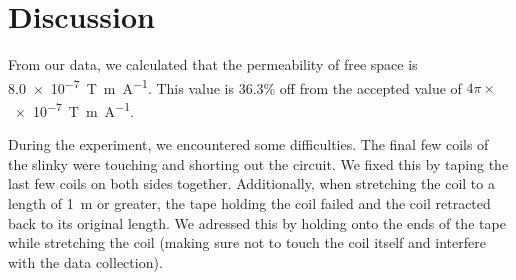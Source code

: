 \documentclass{article}
\begin{document}
\newpage

\section{Discussion}

From our data, we calculated that the permeability of free space is
\SI{8.0e-7}{\tesla\meter\per\ampere}. This value is 36.3\% off from the
accepted value of $4\pi\times$\SI{e-7}{\tesla\meter\per\ampere}.

During the experiment, we encountered some difficulties. The final few coils of
the slinky were touching and shorting out the circuit. We fixed this by taping
the last few coils on both sides together. Additionally, when stretching the
coil to a length of \SI{1}{\meter} or greater, the tape holding the coil failed
and the coil retracted back to its original length. We adressed this by holding
onto the ends of the tape while stretching the coil (making sure not to touch
the coil itself and interfere with the data collection).
\end{document}
